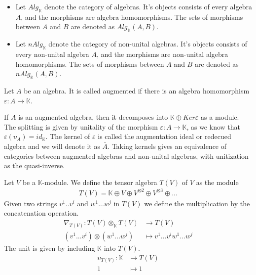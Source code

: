 \documentclass[../thesis.tex]{subfiles}
\begin{document}
            \begin{definition}
                \begin{itemize}
                    \item Let $Alg_{\mathbb{K}}$ denote the category of algebras. It's objects consists of every algebra $A$, and the morphisms are algebra homomorphisms. The sets of morphisms between $A$ and $B$ are denoted as $Alg_{\mathbb{K}}(A,B)$.
                    \item Let $nAlg_{\mathbb{K}}$ denote the category of non-unital algebras. It's objects consists of every non-unital algebra $A$, and the morphisms are non-unital algebra homomorphisms. The sets of morphisms between $A$ and $B$ are denoted as $nAlg_{\mathbb{K}}(A,B)$.
                \end{itemize}
            \end{definition}

            \begin{definition}
                Let $A$ be an algebra. It is called augmented if there is an algebra homomorphism $\varepsilon : A \rightarrow \mathbb{K}$.
            \end{definition}

            If $A$ is an augmented algebra, then it decomposes into $\mathbb{K}\oplus Ker\varepsilon$ as a module. The splitting is given by unitality of the morphism $\varepsilon: A \rightarrow \mathbb{K}$, as we know that $\varepsilon(\upsilon_A) = id_{\mathbb{K}}$. The kernel of $\varepsilon$ is called the augmentation ideal or redecued algebra and we will denote it as $\bar{A}$. Taking kernels gives an equivalence of categories between augmented algebras and non-unital algebras, with unitization as the quasi-inverse.

            \begin{definition}
                Let $V$ be a $\mathbb{K}$-module. We define the tensor algebra $T(V)$ of $V$ as the module
                \begin{align*}
                    T(V) = \mathbb{K}\oplus V\oplus V^{\otimes 2} \oplus V^{\otimes 3} \oplus ...
                \end{align*}
                Given two strings $v^1..v^i$ and $w^1...w^j$ in $T(V)$ we define the multiplication by the concatenation operation.
                \begin{align*}
                    \nabla_{T(V)} : T(V)\otimes_{\mathbb{K}} T(V) & \rightarrow T(V) \\
                    (v^1...v^i)\otimes(w^1...w^j) & \mapsto v^1...v^iw^1...w^j
                \end{align*}
                The unit is given by including $\mathbb{K}$ into $T(V)$.
                \begin{align*}
                    \upsilon_{T(V)} : \mathbb{K} & \rightarrow T(V) \\
                    1 & \mapsto 1
                \end{align*}
            \end{definition}
\end{document}
